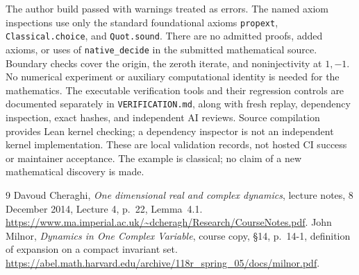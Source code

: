\documentclass[11pt]{article}
\begin{document}
The author build passed with warnings treated as errors. The named axiom
inspections use only the standard foundational axioms
\texttt{propext}, \texttt{Classical.choice}, and \texttt{Quot.sound}.
There are no admitted proofs, added axioms, or uses of \texttt{native\_decide}
in the submitted mathematical source. Boundary checks cover the origin,
the zeroth iterate, and noninjectivity at $1,-1$.
No numerical experiment or auxiliary computational identity is needed for
the mathematics. The executable verification tools and their regression
controls are documented separately in \texttt{VERIFICATION.md}, along with
fresh replay, dependency inspection, exact hashes, and independent AI reviews.
Source compilation provides Lean kernel checking; a dependency inspector
is not an independent kernel implementation. These are local validation
records, not hosted CI success or maintainer acceptance. The example is
classical; no claim of a new mathematical discovery is made.

\begin{thebibliography}{9}
Davoud Cheraghi, \emph{One dimensional real and complex dynamics}, lecture
notes, 8 December 2014, Lecture 4, p.~22, Lemma~4.1.
\url{https://www.ma.imperial.ac.uk/~dcheragh/Research/CourseNotes.pdf}.
John Milnor, \emph{Dynamics in One Complex Variable}, course copy,
\S14, p.~14-1, definition of expansion on a compact invariant set.
\url{https://abel.math.harvard.edu/archive/118r_spring_05/docs/milnor.pdf}.
\end{thebibliography}
\end{document}

